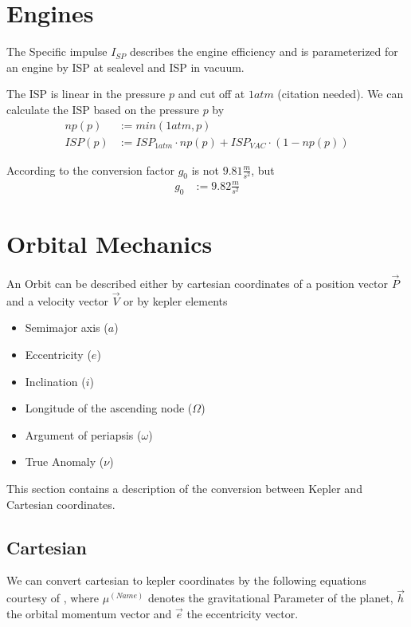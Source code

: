 \documentclass[11pt]{article}
\newcommand{\oa}[1]{\overrightarrow{#1}}
\newcommand{\Pos}{\oa{P}}
\newcommand{\Vel}{\oa{V}}
\begin{document}
\section{Engines}

The Specific impulse $I_{SP}$ describes the engine efficiency and is
parameterized for an engine by ISP at sealevel and ISP in vacuum.

The ISP is linear in the pressure $p$ and cut off at $1atm$
(citation needed).  We can calculate the ISP based on the pressure
$p$ by
\begin{align}
  np(p) &:= min(1 atm, p)\\
  ISP(p) &:= ISP_{1atm} \cdot np(p) + ISP_{VAC} \cdot (1-np(p))
\end{align}

According to \cite{ECF} the conversion factor $g_0$ is not
$9.81\frac{m}{s^2}$, but
\begin{align}
  g_0 &:= 9.82\frac{m}{s^2}
\end{align}

\section{Orbital Mechanics}

An Orbit can be described either by cartesian coordinates of a
position vector $\Pos$ and a velocity vector $\Vel$ or by kepler
elements \cite{Kepler}

\begin{itemize}
\item Semimajor axis ($a$)
\item Eccentricity ($e$)
\item Inclination ($i$)
\item Longitude of the ascending node ($\Omega$)
\item Argument of periapsis ($\omega$)
\item True Anomaly ($\nu$)
\end{itemize}

This section contains a description of the conversion between Kepler
and Cartesian coordinates.

\subsection{Cartesian}

We can convert cartesian to kepler coordinates by the following
equations courtesy of \cite{RSCK}, where $\mu^{(Name)}$ denotes the
gravitational Parameter of the planet, $\oa{h}$ the orbital momentum
vector and $\oa{e}$ the eccentricity vector.
\end{document}
